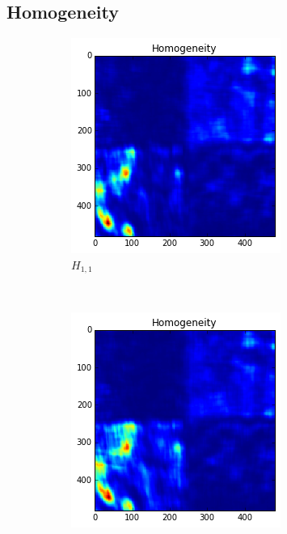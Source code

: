 \documentclass[a4paper]{article}
\begin{document}
\subsection{Homogeneity}

\begin{figure}
    \centering
    \begin{subfigure}[b]{0.30\textwidth}
        \centering
        \includegraphics[width=\textwidth]{hom11.png}
        \caption{%
            $H_{1,1}$
        }
        \label{fig:h11}
    \end{subfigure}
    ~
    \begin{subfigure}[b]{0.30\textwidth}
        \centering
        \includegraphics[width=\textwidth]{hom21.png}

\end{subfigure}
\end{figure}
\end{document}

